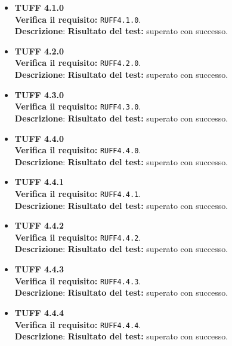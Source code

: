 \begin{itemize}
\item \textbf{TUFF 4.1.0}\\
\textbf{Verifica il requisito:} \texttt{RUFF4.1.0}.\\
\textbf{Descrizione}: %
\textbf{Risultato del test:} superato con successo.

\item \textbf{TUFF 4.2.0}\\
\textbf{Verifica il requisito:} \texttt{RUFF4.2.0}.\\
\textbf{Descrizione}: %
\textbf{Risultato del test:} superato con successo.

\item \textbf{TUFF 4.3.0}\\
\textbf{Verifica il requisito:} \texttt{RUFF4.3.0}.\\
\textbf{Descrizione}: %
\textbf{Risultato del test:} superato con successo.

\item \textbf{TUFF 4.4.0}\\
\textbf{Verifica il requisito:} \texttt{RUFF4.4.0}.\\
\textbf{Descrizione}: %
\textbf{Risultato del test:} superato con successo.

\item \textbf{TUFF 4.4.1}\\
\textbf{Verifica il requisito:} \texttt{RUFF4.4.1}.\\
\textbf{Descrizione}: %
\textbf{Risultato del test:} superato con successo.

\item \textbf{TUFF 4.4.2}\\
\textbf{Verifica il requisito:} \texttt{RUFF4.4.2}.\\
\textbf{Descrizione}: %
\textbf{Risultato del test:} superato con successo.

\item \textbf{TUFF 4.4.3}\\
\textbf{Verifica il requisito:} \texttt{RUFF4.4.3}.\\
\textbf{Descrizione}: %
\textbf{Risultato del test:} superato con successo.

\item \textbf{TUFF 4.4.4}\\
\textbf{Verifica il requisito:} \texttt{RUFF4.4.4}.\\
\textbf{Descrizione}: %
\textbf{Risultato del test:} superato con successo.


\end{itemize}
